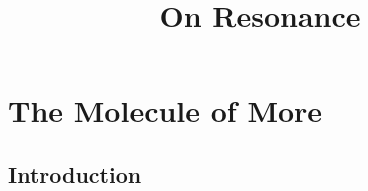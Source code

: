 \documentclass[ebook,12pt,oneside,openany]{memoir}
\begin{document}
\title{On Resonance}
\maketitle
\section{The Molecule of More}
\subsection{Introduction}
\end{document}
